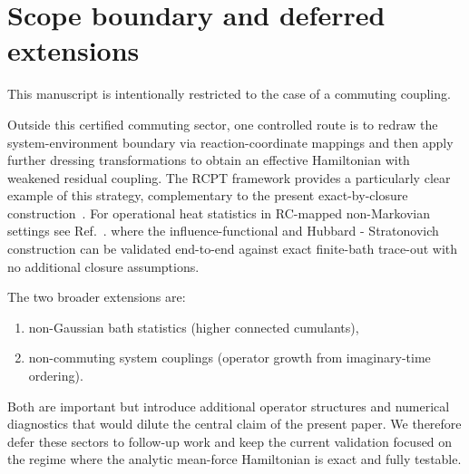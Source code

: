 \section{Scope boundary and deferred extensions}
\label{sec:beyond_gaussian}

This manuscript is intentionally restricted to the case of a commuting coupling.

Outside this certified commuting sector, one controlled route is to redraw the system-environment boundary via reaction-coordinate mappings and then apply further dressing transformations to obtain an effective Hamiltonian with weakened residual coupling. The RCPT framework provides a particularly clear example of this strategy, complementary to the present exact-by-closure construction~\cite{AntoSztrikacsNazirSegal2023,IlesSmithDijkstraLambertNazir2016}. For operational heat statistics in RC-mapped non-Markovian settings see Ref.~\cite{ShubrookIlesSmithNazir2025}.
where the influence-functional and Hubbard - Stratonovich construction can be
validated end-to-end against exact finite-bath trace-out with no additional
closure assumptions.

The two broader extensions are:
\begin{enumerate}
\item non-Gaussian bath statistics (higher connected cumulants),
\item non-commuting system couplings (operator growth from imaginary-time ordering).
\end{enumerate}
Both are important but introduce additional operator structures and numerical
diagnostics that would dilute the central claim of the present paper. We
therefore defer these sectors to follow-up work and keep the current validation
focused on the regime where the analytic mean-force Hamiltonian is exact and
fully testable.
